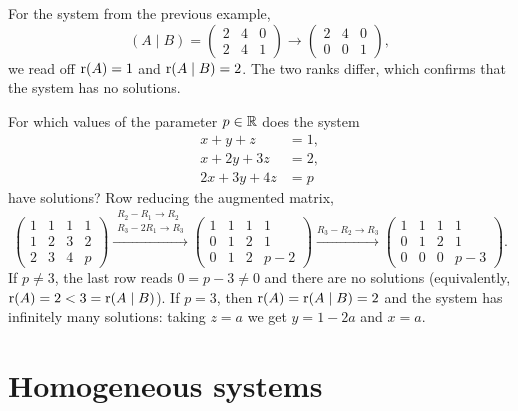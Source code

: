 \begin{example}
For the system from the previous example,
\[
(A\mid B) = \left( \begin{array}{cc|c} 2 & 4 & 0\\ 2 & 4 & 1 \end{array} \right)
\longrightarrow
\left( \begin{array}{cc|c} 2 & 4 & 0\\ 0 & 0 & 1 \end{array} \right),
\]
we read off $\operatorname{r}(A) = 1$ and $\operatorname{r}(A\mid B) = 2$. The two ranks differ, which confirms that the system
has no solutions.
\end{example}

\begin{example}
For which values of the parameter $p\in\mathbb{R}$ does the system
\[
\begin{aligned}
x+y+z &= 1,\\ x+2y+3z &= 2,\\ 2x+3y+4z &= p
\end{aligned}
\]
have solutions? Row reducing the augmented matrix,
\[
\left( \begin{array}{ccc|c}
1 & 1 & 1 & 1\\ 1 & 2 & 3 & 2\\ 2 & 3 & 4 & p
\end{array} \right)
\xrightarrow{\substack{R_2-R_1\to R_2\\ R_3-2R_1\to R_3}}
\left( \begin{array}{ccc|c}
1 & 1 & 1 & 1\\ 0 & 1 & 2 & 1\\ 0 & 1 & 2 & p-2
\end{array} \right)
\xrightarrow{R_3-R_2\to R_3}
\left( \begin{array}{ccc|c}
1 & 1 & 1 & 1\\ 0 & 1 & 2 & 1\\ 0 & 0 & 0 & p-3
\end{array} \right).
\]
If $p\neq 3$, the last row reads $0 = p-3\neq 0$ and there are no solutions (equivalently,
$\operatorname{r}(A) = 2 < 3 = \operatorname{r}(A\mid B)$). If $p = 3$, then $\operatorname{r}(A) = \operatorname{r}(A\mid B) = 2$ and the system has
infinitely many solutions: taking $z = a$ we get $y = 1-2a$ and $x = a$.
\end{example}

\section{Homogeneous systems}

